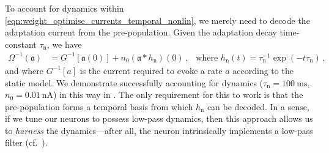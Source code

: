 To account for \ALIF dynamics within \cref{eqn:weight_optimise_currents_temporal_nonlin}, we merely need to decode the adaptation current from the pre-population.
Given the adaptation decay time-constant $\tau_\mathrm{n}$, we have
\begin{align*}
	\Omega^{-1}(\mathfrak{a}) &= G^{-1}[\mathfrak{a}(0)] + n_0 (\mathfrak{a} \ast h_\mathrm{n})(0) \,, & \text{where } h_\mathrm{n}(t) = \tau_\mathrm{n}^{-1} \exp(-t \tau_\mathrm{n}) \,,
\end{align*}
and where $G^{-1}[a]$ is the current required to evoke a rate $a$ according to the static \LIF model.
We demonstrate successfully accounting for \ALIF dynamics ($\tau_\mathrm{n} = \SI{100}{\milli\second}$, $n_0 = \SI{0.01}{\nano\ampere}$) in this way in .
The only requirement for this to work is that the pre-population forms a temporal basis from which $h_\mathrm{n}$ can be decoded.
In a sense, if we tune our neurons to possess low-pass dynamics, then this approach allows us to \emph{harness} the \ALIF dynamics---after all, the \ALIF neuron intrinsically implements a low-pass filter (cf.~).